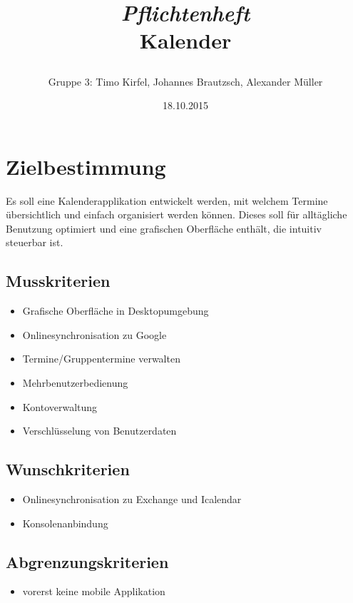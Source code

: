 \documentclass[a4paper]{article}
\title{\begin{center}
		\emph{{\Huge Pflichtenheft}} \\ {\large Kalender}
       \end{center} }
\author{Gruppe 3: Timo Kirfel, Johannes Brautzsch, Alexander Müller}
\date{18.10.2015}
\begin{document}
  \maketitle
  \newpage

  \tableofcontents %
  \newpage

  \section{Zielbestimmung}
		Es soll eine Kalenderapplikation entwickelt werden, mit welchem Termine übersichtlich und einfach organisiert werden können. Dieses soll für alltägliche Benutzung optimiert und eine grafischen Oberfläche enthält, die intuitiv steuerbar ist.

    \subsection{Musskriterien}
        \begin{itemize}
			\item Grafische Oberfläche in Desktopumgebung
			\item Onlinesynchronisation zu Google
			\item Termine/Gruppentermine verwalten
			\item Mehrbenutzerbedienung
			\item Kontoverwaltung
			\item Verschlüsselung von Benutzerdaten
		\end{itemize}

    \subsection{Wunschkriterien}
        \begin{itemize}
			\item Onlinesynchronisation zu Exchange und Icalendar
			\item Konsolenanbindung
		\end{itemize}

    \subsection{Abgrenzungskriterien}
        \begin{itemize}
	        \item vorerst keine mobile Applikation
	    \end{itemize}
\end{document}

